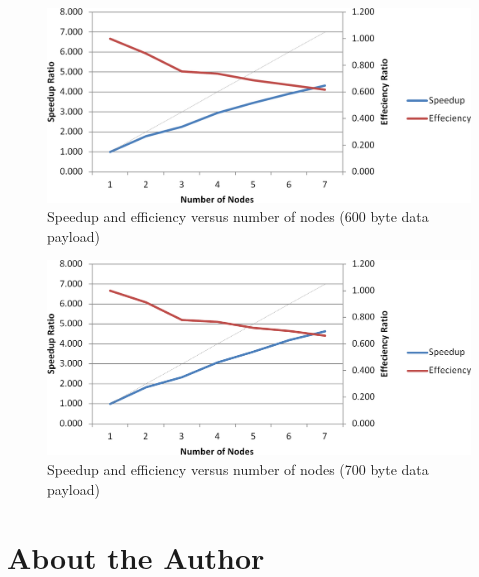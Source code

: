 \begin{appendices}
\begin{figure}[ptb]
	\begin{centering}
		\includegraphics[width=6in]{Appendices/Figures/appendices-convolution_results_600.png}
		\caption{Speedup and efficiency versus number of nodes (600 byte data payload)}
		\label{fig:appendices:convolution_results_600}
	\end{centering}
\end{figure}

\begin{figure}[ptb]
	\begin{centering}
		\includegraphics[width=6in]{Appendices/Figures/appendices-convolution_results_700.png}
		\caption{Speedup and efficiency versus number of nodes (700 byte data payload)}
		\label{fig:appendices:convolution_results_700}
	\end{centering}
\end{figure}

\end{appendices}

\chapter*{About the Author}

